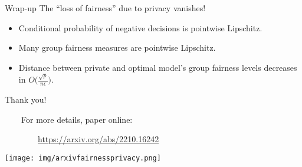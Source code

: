 \documentclass[aspectratio=169,14pt]{beamer}
\begin{document}
\begin{frame}{Wrap-up}{}
  {\large
    The ``loss of fairness'' due to privacy vanishes!
    }
  \pause
  \begin{itemize}
  \item Conditional probability of negative decisions is pointwise Lipschitz.
    \vspace{1em}
    \pause
  \item Many group fairness measures are pointwise Lipschitz.
    \vspace{0.5em}
    \pause
  \item Distance between private and optimal model's group fairness
    levels decreases in $O\Big(\frac{\sqrt{p}}{n\epsilon}\Big)$.
  \end{itemize}
\end{frame}



\begin{frame}{}
  \begin{minipage}[t][\arraycolsep][t]{0.75\linewidth}
    {\LARGE Thank you!}

    \vspace{1em}

    ~~~~For more details, paper online:

    ~~~~~~~~\url{https://arxiv.org/abs/2210.16242}
  \end{minipage}%
  \begin{minipage}{0.25\linewidth}
    \vspace{4em}
    \texttt{[image: img/arxivfairnessprivacy.png]}
  \end{minipage}
\end{frame}
\end{document}

